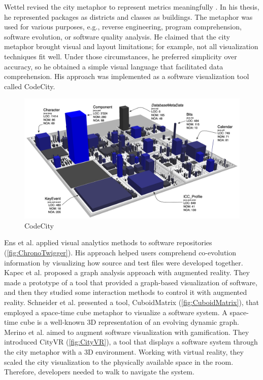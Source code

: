 Wettel revised the city metaphor to represent metrics meaningfully  \cite{Wettel2011}. 
In his thesis, he represented packages as districts and classes as buildings.
The metaphor was used for various purposes, e.g., reverse engineering, program comprehension, software evolution, or software quality analysis. 
He claimed that the city metaphor brought visual and layout limitations; for example, not all visualization techniques fit well.
Under those circumstances, he preferred simplicity over accuracy,
so he obtained a simple visual language that facilitated data comprehension. His approach was implemented as a software visualization tool 
called CodeCity. 


\begin{figure}[ht]
\centering
  \includegraphics[width=0.9\linewidth]{CodeCity.png} 
  \caption{CodeCity}
\end{figure}

Ens et al. \cite{Ens2014} applied visual analytics methods to software repositories (\autoref{fig:ChronoTwigger}).
His approach helped users comprehend co-evolution information by visualizing how source and test files were developed together. 
Kapec et al. \cite{Kapec2015} proposed a graph analysis approach with augmented reality. 
They made a prototype of a tool that provided a graph-based visualization of software, and then they studied some interaction methods to control it with augmented reality.
Schneider et al. \cite{Schneider2016} presented a tool, CuboidMatrix (\autoref{fig:CuboidMatrix}), that employed a space-time cube metaphor to visualize a software system. 
A space-time cube is a well-known 3D representation of an evolving dynamic graph. 
Merino et al. \cite{Merino2017} aimed to augment software visualization with gamification. 
They introduced CityVR (\autoref{fig:CityVR}), a tool that displays a software system through the city metaphor with a 3D environment. 
Working with virtual reality, they scaled the city visualization to the physically available space in the room. 
Therefore, developers needed to walk to navigate the system. 

